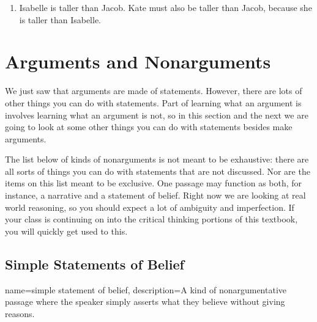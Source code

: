 \begin{enumerate}[label=\arabic*), topsep=0pt, parsep=0pt, itemsep=6pt]
\item Isabelle is taller than Jacob. Kate must also be taller than Jacob, because she is taller than Isabelle. 

\end{enumerate}


\section{Arguments and Nonarguments}
\label{sec:arguments_and_nonarguments}

We just saw that arguments are made of statements. However, there are lots of other things you can do with statements. Part of learning what an argument is involves learning what an argument is not, so in this section and the next we are going to look at some other things you can do with statements besides make arguments. 

The list below of kinds of nonarguments is not meant to be exhaustive: there are all sorts of things you can do with statements that are not discussed. Nor are the items on this list meant to be exclusive. One passage may function as both, for instance, a narrative and a statement of belief. Right now we are looking at real world reasoning, so you should expect a lot of ambiguity and imperfection. If your class is continuing on into the critical thinking portions of this textbook, you will quickly get used to this. 

\subsection{Simple Statements of Belief}

{
name=simple statement of belief,
description={A kind of nonargumentative passage where the speaker simply asserts what they believe without giving reasons. }
}

